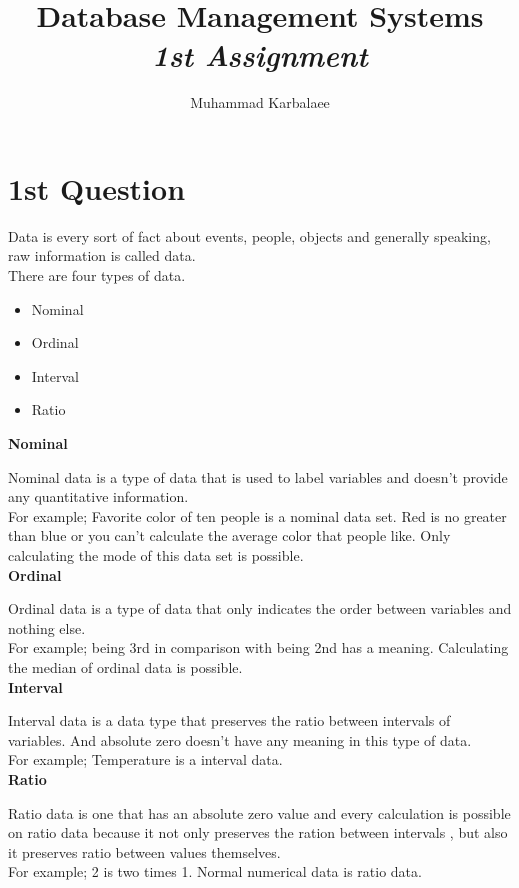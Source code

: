 \documentclass[twocolumn,a4paper, 10pt]{article}
\title{\textbf{Database Management Systems} \\ \emph{1st Assignment}}
\author{Muhammad Karbalaee}
\begin{document}
	\maketitle
    \section*{1st Question}
        Data is every sort of fact about events, people, objects and generally 
        speaking, raw information is called data. \\
        There are four types of data.
        \begin{itemize}
            \item Nominal
            \item Ordinal
            \item Interval
            \item Ratio
        \end{itemize}
        \textbf{Nominal} 


            Nominal data is a type of data that is used to label variables and 
            doesn't provide any quantitative information. \\
            For example; Favorite color of ten people is a nominal data set.
            Red is no greater than blue or you can't calculate the average 
            color that people like. Only calculating the mode of this data set is possible. \\
        \textbf{Ordinal}

        Ordinal data is a type of data that only indicates the order between variables and
        nothing else. \\ For example; being 3rd in comparison with being 2nd 
        has a meaning. Calculating the median of ordinal data is possible.\\ 
        \textbf{Interval}

        Interval data is a data type that preserves the ratio between intervals of variables.
        And absolute zero doesn't have any meaning in this type of data.
        \\ For example; Temperature is a interval data. \\ 
        \textbf{Ratio}

        Ratio data is one that has an absolute zero value and every calculation is 
        possible on ratio data because it not only preserves the ration between intervals 
        , but also it preserves ratio between values themselves. \\ 
        For example; 2 is two times 1. Normal numerical data is ratio data. 
\end{document}
